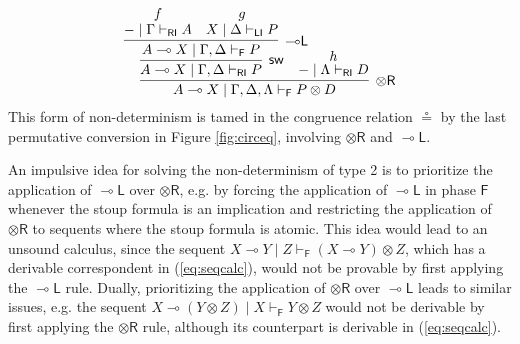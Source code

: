 \documentclass[submission,copyright,creativecommons]{eptcs}
\theoremstyle{definition}
\newcommand{\tr}{\otimes \mathsf{R}}
\newcommand{\lleft}{{\multimap}\mathsf{L}}
\newcommand{\ot}{\otimes}
\newcommand{\lolli}{\multimap}
\newcommand{\RI}{\mathsf{RI}}
\newcommand{\LI}{\mathsf{LI}}
\newcommand{\F}{\mathsf{F}}
\newcommand{\proofbox}[1]{\begin{tabular}{l} #1 \end{tabular}}
\begin{document}
\begin{enumerate}
\begin{equation}
{%
      \infer[\tr]{A \lolli X \mid \Gamma , \Delta , \Lambda \vdash_{\F} P \ot D}{
        \infer[\mathsf{sw}]{A \lolli X \mid \Gamma , \Delta \vdash_{\RI} P}{
          \infer[\lleft]{A \lolli X \mid \Gamma , \Delta \vdash_{\F} P}{
            \deduce{- \mid \Gamma \vdash_{\RI} A}{f}
            &
            \deduce{X \mid \Delta \vdash_{\LI} P}{g}
          }
        }
        &\hspace{-.6cm}
        \deduce{- \mid \Lambda \vdash_{\RI} D}{h}
      }
    }
    \end{equation}
    This form of non-determinism is tamed in the congruence relation $\circeq$ by the last permutative conversion in Figure \ref{fig:circeq}, involving $\tr$ and $\lleft$.
\end{enumerate}


An impulsive idea for solving the non-determinism of type 2 is to prioritize the application of $\lleft$ over $\tr$, e.g. by forcing the application of $\lleft$ in phase $\F$ whenever the stoup formula is an implication and restricting the application of $\tr$ to sequents where the stoup formula is atomic. This idea would lead to an unsound calculus, since the sequent $X \lolli Y \mid Z \vdash_{\F} (X \lolli Y) \ot Z$, which has a derivable correspondent in (\ref{eq:seqcalc}), would not be provable by first applying the $\lleft$ rule.
Dually, prioritizing the application of $\tr$ over $\lleft$ leads to similar issues, e.g. the sequent $X \lolli (Y \ot Z) \mid X \vdash_\F Y \ot Z$ would not be derivable by first applying the $\tr$ rule, although its counterpart is derivable in  (\ref{eq:seqcalc}).
\end{document}
